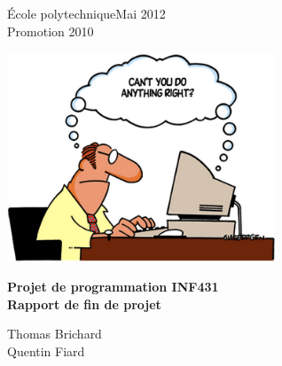 École polytechnique\hfill Mai 2012\\
Promotion 2010
\thispagestyle{empty}
\newlength{\margeimage}
\setlength{\margeimage}{1cm}
\vspace{\margeimage}
\begin{center}
\includegraphics[width=8cm]{./images/blague.png}
\end{center}
\vspace{\margeimage}
\begin{center}
\begin{Large}
\bf
Projet de programmation INF431\vspace{0.3cm}\\
Rapport de fin de projet
\end{Large}
\end{center}
\vspace*{\fill}
\begin{flushright}
Thomas Brichard\\
Quentin Fiard
\end{flushright}